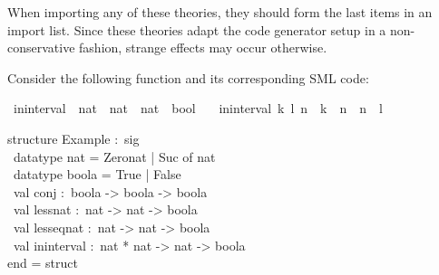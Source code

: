 \begin{isabellebody}
\begin{isamarkuptext}
  \begin{warn}
    When importing any of these theories, they should form the last
    items in an import list.  Since these theories adapt the code
    generator setup in a non-conservative fashion, strange effects may
    occur otherwise.
  \end{warn}%
\end{isamarkuptext}%
\isamarkuptrue%
%
\isamarkuptrue%
%
\begin{isamarkuptext}%
Consider the following function and its corresponding SML code:%
\end{isamarkuptext}%
\isamarkuptrue%
%
\isadelimquote
%
\endisadelimquote
%
\isatagquote
{}\isamarkupfalse%
\ in{\isacharunderscore}interval\ {\isacharcolon}{\isacharcolon}\ {\isachardoublequoteopen}nat\ {\isasymtimes}\ nat\ {\isasymRightarrow}\ nat\ {\isasymRightarrow}\ bool{\isachardoublequoteclose}\ \isanewline
\ \ {\isachardoublequoteopen}in{\isacharunderscore}interval\ {\isacharparenleft}k{\isacharcomma}\ l{\isacharparenright}\ n\ {\isasymlongleftrightarrow}\ k\ {\isasymle}\ n\ {\isasymand}\ n\ {\isasymle}\ l{\isachardoublequoteclose}%
\endisatagquote
{\isafoldquote}%
%
\isadelimquote
%
\endisadelimquote
%
\isadeliminvisible
%
\endisadeliminvisible
%
\isataginvisible
%
\endisataginvisible
{\isafoldinvisible}%
%
\isadeliminvisible
%
\endisadeliminvisible
%
\isadelimquote
%
\endisadelimquote
%
\isatagquote
%
\begin{isamarkuptext}%
\isatypewriter%
\noindent%
\hspace*{0pt}structure Example :~sig\\
\hspace*{0pt} ~datatype nat = Zero{}nat | Suc of nat\\
\hspace*{0pt} ~datatype boola = True | False\\
\hspace*{0pt} ~val conj :~boola -> boola -> boola\\
\hspace*{0pt} ~val less{}nat :~nat -> nat -> boola\\
\hspace*{0pt} ~val less{}eq{}nat :~nat -> nat -> boola\\
\hspace*{0pt} ~val in{}interval :~nat * nat -> nat -> boola\\
\hspace*{0pt}end = struct\\

\end{isamarkuptext}
\end{isabellebody}
